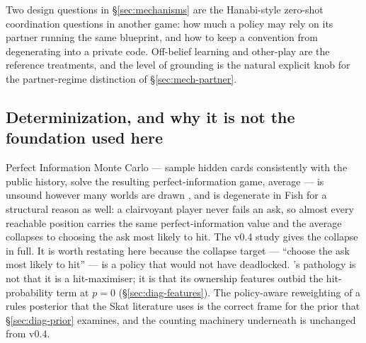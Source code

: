 Two design questions in \S\ref{sec:mechanisms} are the Hanabi-style zero-shot
coordination questions \cite{bard-hanabi} in another game: how much a policy may
rely on its partner running the same blueprint, and how to keep a convention from
degenerating into a private code. Off-belief learning \cite{hu-obl} and
other-play \cite{hu-otherplay} are the reference treatments, and the level of
grounding is the natural explicit knob for the partner-regime distinction of
\S\ref{sec:mech-partner}.

\subsection{Determinization, and why it is not the foundation used here}

Perfect Information Monte Carlo --- sample hidden cards consistently with the
public history, solve the resulting perfect-information game, average
\cite{ginsberg-gib} --- is unsound however many worlds are drawn
\cite{frank-basin-ai}, and is degenerate in Fish for a structural reason as well:
a clairvoyant player never fails an ask, so almost every reachable position
carries the same perfect-information value and the average collapses to choosing
the ask most likely to hit. The v0.4 study gives the collapse in full. It is
worth restating here because the collapse target --- ``choose the ask most likely
to hit'' --- is a policy that would not have deadlocked. \vfour{}'s pathology is
not that it is a hit-maximiser; it is that its ownership features outbid the
hit-probability term at $p=0$ (\S\ref{sec:diag-features}). The policy-aware
reweighting of a rules posterior that the Skat literature uses
\cite{solinas-supervised,rebstock-inference,buro-kermit} is the correct frame for
the prior that \S\ref{sec:diag-prior} examines, and the counting machinery
underneath \cite{lsw,cryan-dyer} is unchanged from v0.4.
